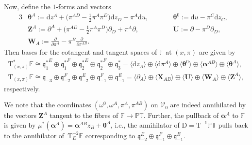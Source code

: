 \documentclass[10pt,a4paper]{amsart}
\numberwithin{equation}{section}
\newcommand{\parderv}[2] {\frac{\partial#1}{\partial#2}}
\newcommand{\mc} [1]{\mathcal{#1}}
\newcommand{\Drm} {{\mathrm{D}}}
\newcommand{\dd} {\mathrm{d}}
\newcommand{\Tgt} {\mathrm{T}}
\newcommand{\mfq} {\mathfrak{q}}
\newcommand{\PT} {\mathbb{PT}}
\newcommand{\F} {\mathbb{F}}
\begin{document}
Now, def\/ine the $1$-forms and vectors
\begin{alignat*}{3}
& \bm{\theta}^A := \dd z^A + \big( \pi^{AD} - \tfrac{1}{2} \pi^{A} \pi^D \big) \dd z_D + \pi^A \dd u ,\qquad && \bm{\theta}^0 := \dd u - \pi^C \dd z_C , &\\
& \bm{Z}^{A} := \partial ^{A} + \big( \pi^{AD} - \tfrac{1}{2} \pi^{A} \pi^D \big) \partial _D + \pi^{A} \partial , \qquad &&
\bm{U} := \partial - \pi^D \partial _D ,& \\
 & \bm{W}_{A} := \parderv{}{\pi^{A}} - \pi^{B} \parderv{}{\pi^{AB}} .&&&
\end{alignat*}
Then bases for the cotangent and tangent spaces of $\F$ at $(x,\pi)$ are given by
\begin{subequations}
\begin{gather*}
\Tgt^*_{(x,\pi)} \F \cong {\mfq^*_1}^E \oplus {\mfq_1^*}^F \oplus {\mfq_2^*}^E \oplus {\mfq_2^*}^F \oplus \mfq_3^*
= \langle \dd z_A \rangle \oplus \big\langle \dd \pi^A \big\rangle \oplus \langle \bm{\theta}^0 \rangle \oplus \big\langle \bm{\alpha}^{AB} \big\rangle \oplus \big\langle \bm{\theta}^A \big\rangle , \\ %
\Tgt_{(x,\pi)} \F \cong \mfq_{-3} \oplus \mfq_{-2}^F \oplus \mfq_{-2}^E \oplus \mfq_{-1}^F \oplus \mfq_{-1}^E
= \langle \partial_{A} \rangle \oplus \langle \bm{X}_{AB} \rangle \oplus \langle \bm{U} \rangle \oplus \langle \bm{W}_{A} \rangle \oplus \big\langle \bm{Z}^{A} \big\rangle , %
\end{gather*}
\end{subequations}
respectively.

We note that the coordinates $(\omega^0,\omega^A,\pi^A,\pi^{AB})$ on $\mc{V}_0$ are indeed annihilated by the vectors $\bm{Z}^A$ tangent to the f\/ibres of $\F \rightarrow \PT$. Further, the pullback of $\bm{\alpha}^A$ to $\F$ is given by $\mu^* (\bm{\alpha}^A ) = \bm{\alpha}^{AB} z_B + \bm{\theta}^A$, i.e., the annihilator of $\Drm = \Tgt^{-1} \PT$ pulls back to the annihilator of~$\Tgt^{-2}_E \F$ corresponding to $\mfq_{-2}^E \oplus \mfq_{-1}^F \oplus \mfq_{-1}^E$.
\end{document}
